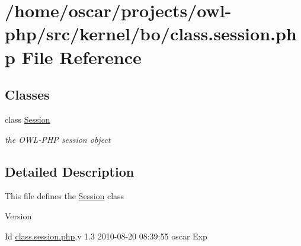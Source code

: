 \section{/home/oscar/projects/owl-\/php/src/kernel/bo/class.session.php File Reference}
\label{class_8session_8php}
\subsection*{Classes}
\begin{DoxyCompactItemize}
\item 
class \hyperlink{classSession}{Session}
\begin{DoxyCompactList}\small\item\em the OWL-\/PHP session object \item\end{DoxyCompactList}\end{DoxyCompactItemize}


\subsection{Detailed Description}
This file defines the \hyperlink{classSession}{Session} class \begin{DoxyVersion}{Version}

\end{DoxyVersion}
\begin{DoxyParagraph}{Id}
\hyperlink{class_8session_8php}{class.session.php},v 1.3 2010-\/08-\/20 08:39:55 oscar Exp 
\end{DoxyParagraph}

